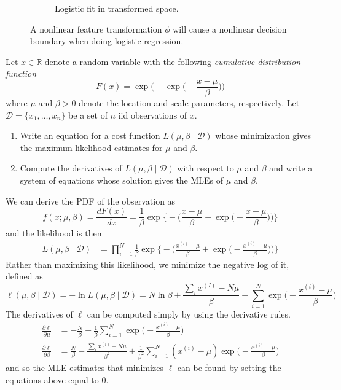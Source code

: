 \documentclass{article}
\begin{document}
\begin{figure}[H]
\begin{subfigure}[b]{0.35\textwidth}
          \caption{Logistic fit in transformed space. }
          \label{fig:transformed_trained}
      \end{subfigure}
      \caption{A nonlinear feature transformation $\phi$ will cause a nonlinear decision boundary when doing logistic regression. }
      \label{fig:logistic_transformed}
    \end{figure}

    \begin{example}
      Let $x \in \mathbb{R}$ denote a random variable with the following \textit{cumulative distribution function} 
        \[F(x) = \exp \bigg( - \exp \bigg( - \frac{x - \mu}{\beta} \bigg) \bigg) \] 
      where $\mu$ and $\beta > 0$ denote the location and scale parameters, respectively. Let $\mathcal{D} = \{x_1, \ldots, x_n\}$ be a set of $n$ iid observations of $x$. 
      \begin{enumerate}
        \item Write an equation for a cost function $L(\mu, \beta \mid \mathcal{D})$ whose minimization gives the maximum likelihood estimates for $\mu$ and $\beta$. 
        \item Compute the derivatives of $L(\mu, \beta \mid \mathcal{D})$ with respect to $\mu$ and $\beta$ and write a system of equations whose solution gives the MLEs of $\mu$ and $\beta$. 
      \end{enumerate}
    \end{example}

    \begin{solution}
      We can derive the PDF of the observation as 
        \[f(x; \mu, \beta) = \frac{d F(x)}{dx} = \frac{1}{\beta} \exp \bigg\{ - \bigg( \frac{x - \mu}{\beta} + \exp \Big( - \frac{x - \mu}{\beta}\Big) \bigg) \bigg\}\] 
      and the likelihood is then 
      \begin{align*}
        L(\mu, \beta \mid \mathcal{D}) & = \prod_{i=1}^N \frac{1}{\beta} \exp \bigg\{ - \bigg( \frac{x^{(i)} - \mu}{\beta} + \exp \Big( - \frac{x^{(i)} - \mu}{\beta}\Big) \bigg) \bigg\}
      \end{align*}
      Rather than maximizing this likelihood, we minimize the negative log of it, defined as 
        \[ \ell(\mu, \beta \mid \mathcal{D}) = - \ln L(\mu, \beta \mid \mathcal{D}) = N \ln{\beta} + \frac{\sum_{i} x^{(I)} - N \mu}{\beta} + \sum_{i=1}^N \exp \Big( - \frac{x^{(i)} - \mu}{\beta} \Big) \]    
      The derivatives of $\ell$ can be computed simply by using the derivative rules.  
      \begin{align*}
        \frac{\partial \ell}{\partial \mu} & = - \frac{N}{\beta} + \frac{1}{\beta} \sum_{i=1}^N \exp \Big( - \frac{x^{(i)} - \mu}{\beta} \Big) \\
        \frac{\partial \ell}{\partial \beta} & = \frac{N}{\beta} - \frac{\sum_{i} x^{(i)} - N \mu}{\beta^2} + \frac{1}{\beta^2} \sum_{i=1}^N (x^{(i)} - \mu) \exp \Big( - \frac{x^{(i)} - \mu}{\beta} \Big)
      \end{align*}
      and so the MLE estimates that minimizes $\ell$ can be found by setting the equations above equal to $0$. 
    \end{solution}
\end{document}
